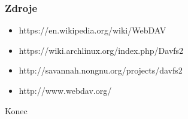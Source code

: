 \documentclass{beamer}
\begin{document}

\begin{frame}
\frametitle{Zdroje}
    \begin{itemize}
        \item https://en.wikipedia.org/wiki/WebDAV
        \item https://wiki.archlinux.org/index.php/Davfs2
        \item http://savannah.nongnu.org/projects/davfs2
        \item http://www.webdav.org/
    \end{itemize}
\end{frame}


\begin{frame}
\Huge{\centerline{Konec}}
\end{frame}

\end{document}
